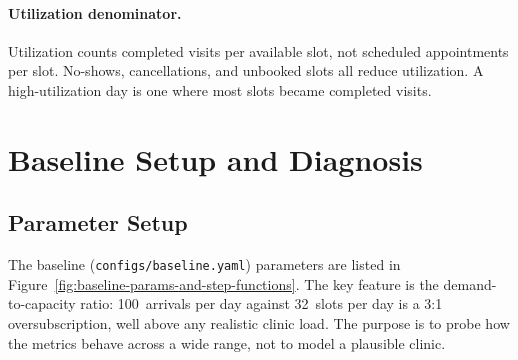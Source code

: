 \documentclass[11pt]{article}
\begin{document}
\paragraph{Utilization denominator.}
Utilization counts completed visits per available slot, not scheduled
appointments per slot. No-shows, cancellations, and unbooked slots all reduce
utilization. A high-utilization day is one where most slots became completed
visits.

\section{Baseline Setup and Diagnosis}
\label{sec:baseline}

\subsection{Parameter Setup}

The baseline (\texttt{configs/baseline.yaml}) parameters are listed in
Figure~\ref{fig:baseline-params-and-step-functions}. The key feature is the demand-to-capacity ratio:
100~arrivals per day against 32~slots per day is a 3:1 oversubscription,
well above any realistic clinic load. The purpose is to probe how the
metrics behave across a wide range, not to model a plausible clinic.
\end{document}
